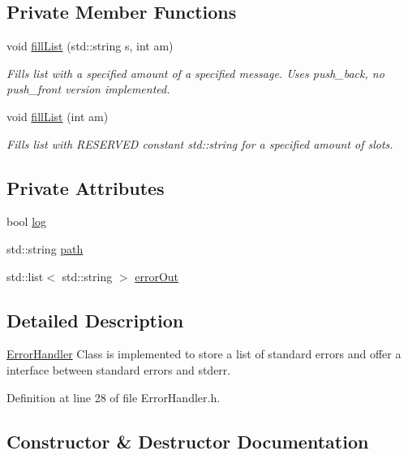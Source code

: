 \subsection*{Private Member Functions}
\begin{DoxyCompactItemize}
\item 
void \mbox{\hyperlink{classErrorHandler_a3036b8ff4299ac0505b6b2ca6fab11a1}{fill\+List}} (std\+::string s, int am)
\begin{DoxyCompactList}\small\item\em Fills list with a specified amount of a specified message. Uses push\+\_\+back, no push\+\_\+front version implemented. \end{DoxyCompactList}\item 
void \mbox{\hyperlink{classErrorHandler_a4edd505cdb0ae60da6f9e26b0fb90f68}{fill\+List}} (int am)
\begin{DoxyCompactList}\small\item\em Fills list with R\+E\+S\+E\+R\+V\+ED constant std\+::string for a specified amount of slots. \end{DoxyCompactList}\end{DoxyCompactItemize}
\subsection*{Private Attributes}
\begin{DoxyCompactItemize}
\item 
bool \mbox{\hyperlink{classErrorHandler_ad1dc2ca6c4b226730361cc8d7b786e30}{log}}
\item 
std\+::string \mbox{\hyperlink{classErrorHandler_aeabbc987b7eaa01b6d006b55b4e00574}{path}}
\item 
std\+::list$<$ std\+::string $>$ \mbox{\hyperlink{classErrorHandler_aeb3bff116fcb83a58defbef8e8111f0e}{error\+Out}}
\end{DoxyCompactItemize}


\subsection{Detailed Description}
\mbox{\hyperlink{classErrorHandler}{Error\+Handler}} Class is implemented to store a list of standard errors and offer a interface between standard errors and stderr. 

Definition at line 28 of file Error\+Handler.\+h.



\subsection{Constructor \& Destructor Documentation}
\mbox{\label{classErrorHandler_a7e5f379bd231442b898cef94556b2107}} 
